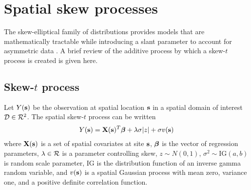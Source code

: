 \documentclass[useAMS,usenatbib,referee]{biom}
\begin{document}

\section{Spatial skew processes}\label{s:spatialskew}
The skew-elliptical family of distributions provides models that are mathematically tractable while introducing a slant parameter to account for asymmetric data \citep{Azzalini2014}.
A brief review of the additive process by which a skew-$t$ process is created is given here.

\subsection{Skew-$t$ process} \label{s:skewt}
Let $Y(\mbox{\bf s})$ be the observation at spatial location $\mbox{\bf s}$ in a spatial domain of interest $\calD \in \calR^2$.
The spatial skew-$t$ process can be written
\begin{align}
  Y(\mbox{\bf s}) = \mbox{\bf X}(\mbox{\bf s})^T \mbox{\boldmath $\beta$} + \lambda \sigma |z| + \sigma v(\mbox{\bf s})
\end{align}
where $\mbox{\bf X}(\mbox{\bf s})$ is a set of spatial covariates at site $\mbox{\bf s}$, $\mbox{\boldmath $\beta$}$ is the vector of regression parameters, $\lambda \in \calR$ is a parameter controlling skew, $z \sim N(0, 1)$, $\sigma^2 \sim \text{IG}(a, b)$ is random scale parameter, IG is the distribution function of an inverse gamma random variable, and $v(\mbox{\bf s})$ is a spatial Gaussian process with mean zero, variance one, and a positive definite correlation function.
\end{document}
